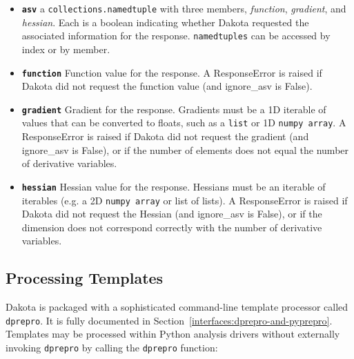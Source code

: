 \begin{itemize}
  \item {} \label{index:dakota.interfacing.Response.asv}\textbf{\texttt{asv}} a {\tt collections.namedtuple} with three members, \emph{function}, \emph{gradient}, and \emph{hessian}.
Each is a boolean indicating whether Dakota requested the
associated information for the response. {\tt namedtuples} can be
accessed by index or by member.

  \item {} \label{index:dakota.interfacing.Response.function}\textbf{\texttt{function}} Function value for the response. A ResponseError
is raised if Dakota did not request the function value (and
ignore\_asv is False).
  \item{} \label{index:dakota.interfacing.Response.gradient}\textbf{\texttt{gradient}} Gradient for the response. Gradients must be a 1D iterable of values that can be converted to floats, such as a {\tt list} or 1D {\tt numpy array}. A ResponseError is raised if Dakota did not request the gradient (and ignore\_asv is False), or if the number of elements does not equal the number of derivative variables.

  \item {} \label{index:dakota.interfacing.Response.hessian}\textbf{\texttt{hessian}} Hessian value for the response. Hessians must be an iterable of iterables (e.g. a 2D {\tt numpy array} or list of lists). A ResponseError is raised if Dakota did not request the Hessian (and ignore\_asv is False), or if the dimension does not correspond correctly with the number of derivative variables.

\end{itemize}

\subsection{Processing Templates}

Dakota is packaged with a sophisticated command-line template processor
called \texttt{dprepro}. It is fully documented in 
Section~\ref{interfaces:dprepro-and-pyprepro}. Templates may be processed 
within Python analysis drivers without externally invoking \texttt{dprepro} 
by calling the \texttt{dprepro} function:


